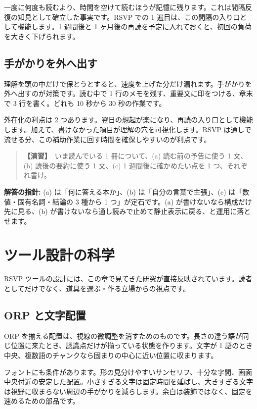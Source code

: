 \documentclass{article}
\begin{document}
一度に何度も読むより、時間を空けて読むほうが記憶に残ります。これは間隔反復の知見として確立した事実です。RSVP での 1 遍目は、この間隔の入り口として機能します。1 週間後と 1 ヶ月後の再読を予定に入れておくと、初回の負荷を大きく下げられます。

\subsection{手がかりを外へ出す}

理解を頭の中だけで保とうとすると、速度を上げた分だけ漏れます。手がかりを外へ出すのが対策です。読む中で 1 行のメモを残す、重要文に印をつける、章末で 3 行を書く。どれも 10 秒から 30 秒の作業です。

外在化の利点は 2 つあります。翌日の想起が楽になり、再読の入り口として機能します。加えて、書けなかった項目が理解の穴を可視化します。RSVP は通しで流せる分、この補助作業に回す時間を確保しやすいのが利点です。

\begin{quote}
\textbf{【演習】}\ いま読んでいる 1 冊について、(a) 読む前の予告に使う 1 文、(b) 読後の要約に使う 1 文、(c) 1 週間後に確かめたい点を 1 つ、それぞれ書け。
\end{quote}

\textbf{解答の指針:} (a) は「何に答える本か」、(b) は「自分の言葉で主張」、(c) は「数値・固有名詞・結論の 3 種から 1 つ」が定石です。(a) が書けないなら構成だけ先に見る、(b) が書けないなら通し読みで止めて静止表示に戻る、と運用に落とせます。

\section{ツール設計の科学}

RSVP ツールの設計には、この章で見てきた研究が直接反映されています。読者としてだけでなく、道具を選ぶ・作る立場からの視点です。

\subsection{ORP と文字配置}

ORP を揃える配置は、視線の微調整を消すためのものです。長さの違う語が同じ位置に来たとき、認識点だけが揃っている状態を作ります。文字が 1 語のとき中央、複数語のチャンクなら固まりの中心に近い位置に収まります。

フォントにも条件があります。形の見分けやすいサンセリフ、十分な字間、画面中央付近の安定した配置。小さすぎる文字は固定時間を延ばし、大きすぎる文字は視野に収まらない周辺の手がかりを減らします。余白は装飾ではなく、固定を速めるための部品です。
\end{document}

